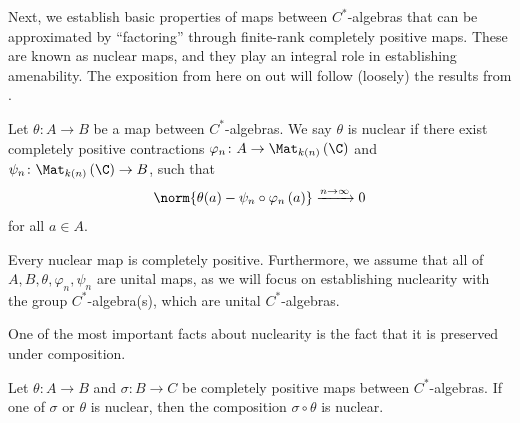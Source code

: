Next, we establish basic properties of maps between $C^{\ast}$-algebras that can be approximated by ``factoring'' through finite-rank completely positive maps. These are known as nuclear maps, and they play an integral role in establishing amenability. The exposition from here on out will follow (loosely) the results from \cite{brown_and_ozawa}.
\begin{definition}
  Let $\theta\colon A\rightarrow B$ be a map between $C^{\ast}$-algebras. We say $\theta$ is nuclear if there exist completely positive contractions $\varphi_n\colon A\rightarrow \Mat_{k(n)}\left( \C \right)$ and $\psi_n\colon \Mat_{k(n)}\left( \C \right)\rightarrow B$, such that
  \begin{align*}
    \norm{\theta(a) - \psi_n\circ \varphi_n\left( a \right)}\xrightarrow{n\rightarrow\infty} 0
  \end{align*}
  for all $a\in A$.
\end{definition}
\begin{remark}
Every nuclear map is completely positive. Furthermore, we assume that all of $A,B,\theta,\varphi_n,\psi_n$ are unital maps, as we will focus on establishing nuclearity with the group $C^{\ast}$-algebra(s), which are unital $C^{\ast}$-algebras.
\end{remark}
One of the most important facts about nuclearity is the fact that it is preserved under composition.
\begin{proposition}\label{prop:nuclearity_composition}
  Let $\theta\colon A\rightarrow B$ and $\sigma\colon B\rightarrow C$ be completely positive maps between $C^{\ast}$-algebras. If one of $\sigma$ or $\theta$ is nuclear, then the composition $\sigma\circ\theta$ is nuclear.
\end{proposition}
